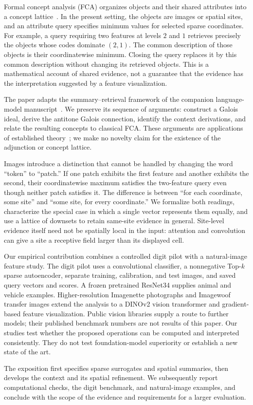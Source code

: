 Formal concept analysis (FCA) organizes objects and their shared
attributes into a concept lattice~\cite{ganter1999formal}. In the present
setting, the objects are images or spatial sites, and an attribute query
specifies minimum values for selected sparse coordinates. For example, a
query requiring two features at levels $2$ and $1$ retrieves precisely the
objects whose codes dominate $(2,1)$. The common description of those
objects is their coordinatewise minimum. Closing the query replaces it
by this common description without changing its retrieved objects.
This is a mathematical account of shared evidence, not a guarantee that
the evidence has the interpretation suggested by a feature visualization.

The paper adapts the summary--retrieval framework of the companion
language-model manuscript~\cite{tsinadzeCompanion}. We preserve its
sequence of arguments: construct a Galois ideal, derive the antitone
Galois connection, identify the context derivations, and relate the
resulting concepts to classical FCA. These arguments are applications of
established theory~\cite{FCA_Latt_Theor,ganter2001pattern}; we make no
novelty claim for the existence of the adjunction or concept lattice.

Images introduce a distinction that cannot be handled by changing the
word ``token'' to ``patch.'' If one patch exhibits the first feature and
another exhibits the second, their coordinatewise maximum satisfies the
two-feature query even though neither patch satisfies it. The difference
is between ``for each coordinate, some site'' and ``some site, for every
coordinate.'' We formalize both readings, characterize the special case
in which a single vector represents them equally, and use a lattice of
downsets to retain same-site evidence in general. Site-level evidence
itself need not be spatially local in the input: attention and convolution
can give a site a receptive field larger than its displayed cell.

Our empirical contribution combines a controlled digit pilot with a
natural-image feature study. The digit pilot uses a convolutional
classifier, a nonnegative Top-$k$ sparse autoencoder, separate training,
calibration, and test images, and saved query vectors and scores. A frozen
pretrained ResNet34 supplies animal and vehicle examples. Higher-resolution
Imagenette photographs and Imagewoof transfer images extend the analysis
to a DINOv2 vision transformer and gradient-based feature visualization.
Public vision
libraries supply a route to further models; their published benchmark
numbers are not results of this paper. Our studies test whether the
proposed operations can be computed and interpreted consistently. They
do not test foundation-model superiority or establish a new state of
the art.

The exposition first specifies sparse surrogates and spatial summaries,
then develops the context and its spatial refinement. We subsequently
report computational checks, the digit benchmark, and natural-image
examples, and conclude with
the scope of the evidence and requirements for a larger evaluation.
